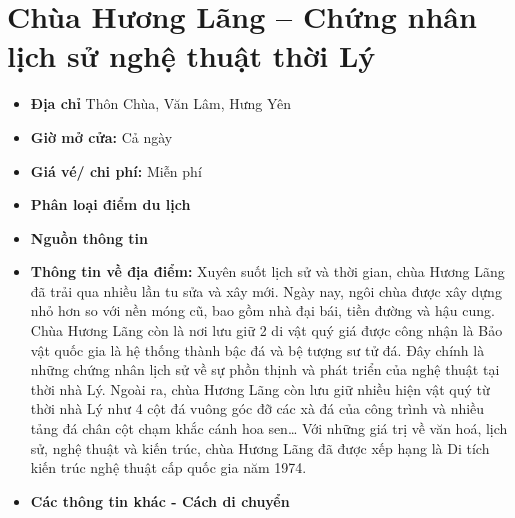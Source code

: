 \documentclass{article}
\begin{document}
\section{Chùa Hương Lãng – Chứng nhân lịch sử nghệ thuật thời Lý}
\begin{itemize}
    \item{\textbf{Địa chỉ}} Thôn Chùa, Văn Lâm, Hưng Yên

    \item{\textbf{Giờ mở cửa:}} Cả ngày

    \item{\textbf{Giá vé/ chi phí:}} Miễn phí

    \item{\textbf{Phân loại điểm du lịch}}

    \item{\textbf{Nguồn thông tin}}

    \item{\textbf{Thông tin về địa điểm:}} Xuyên suốt lịch sử và thời gian, chùa Hương Lãng đã trải qua nhiều lần tu sửa và xây mới. Ngày nay, ngôi chùa được xây dựng nhỏ hơn so với nền móng cũ, bao gồm nhà đại bái, tiền đường và hậu cung. Chùa Hương Lãng còn là nơi lưu giữ 2 di vật quý giá được công nhận là Bảo vật quốc gia là hệ thống thành bậc đá và bệ tượng sư tử đá. Đây chính là những chứng nhân lịch sử về sự phồn thịnh và phát triển của nghệ thuật tại thời nhà Lý. Ngoài ra, chùa Hương Lãng còn lưu giữ nhiều hiện vật quý từ thời nhà Lý như 4 cột đá vuông góc đỡ các xà đá của công trình và nhiều tảng đá chân cột chạm khắc cánh hoa sen… Với những giá trị về văn hoá, lịch sử, nghệ thuật và kiến trúc, chùa Hương Lãng đã được xếp hạng là Di tích kiến trúc nghệ thuật cấp quốc gia năm 1974.
\end{itemize}

\begin{itemize}
    \item{\textbf{Các thông tin khác - Cách di chuyển}}
\end{itemize}
\end{document}

